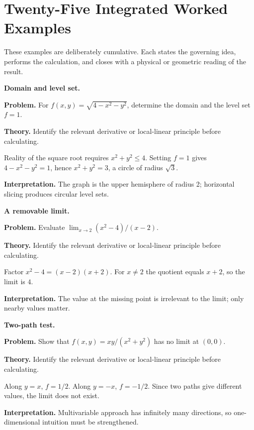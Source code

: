 \section{Twenty-Five Integrated Worked Examples}
\label{sec:ch2-worked-examples}

These examples are deliberately cumulative.  Each states the governing idea,
performs the calculation, and closes with a physical or geometric reading of
the result.

\begin{workedexample}
\textbf{Domain and level set.}\par
\textbf{Problem.} For $f(x,y)=\sqrt{4-x^2-y^2}$, determine the domain and the level set $f=1$.

\textbf{Theory.} Identify the relevant derivative or local-linear principle before calculating.

\begin{solution}
Reality of the square root requires $x^2+y^2\le4$.  Setting $f=1$ gives $4-x^2-y^2=1$, hence $x^2+y^2=3$, a circle of radius $\sqrt3$.

\textbf{Interpretation.} The graph is the upper hemisphere of radius 2; horizontal slicing produces circular level sets.
\end{solution}
\end{workedexample}

\begin{workedexample}
\textbf{A removable limit.}\par
\textbf{Problem.} Evaluate $\lim_{x\to2}(x^2-4)/(x-2)$.

\textbf{Theory.} Identify the relevant derivative or local-linear principle before calculating.

\begin{solution}
Factor $x^2-4=(x-2)(x+2)$.  For $x\ne2$ the quotient equals $x+2$, so the limit is $4$.

\textbf{Interpretation.} The value at the missing point is irrelevant to the limit; only nearby values matter.
\end{solution}
\end{workedexample}

\begin{workedexample}
\textbf{Two-path test.}\par
\textbf{Problem.} Show that $f(x,y)=xy/(x^2+y^2)$ has no limit at $(0,0)$.

\textbf{Theory.} Identify the relevant derivative or local-linear principle before calculating.

\begin{solution}
Along $y=x$, $f=1/2$.  Along $y=-x$, $f=-1/2$.  Since two paths give different values, the limit does not exist.

\textbf{Interpretation.} Multivariable approach has infinitely many directions, so one-dimensional intuition must be strengthened.
\end{solution}
\end{workedexample}

